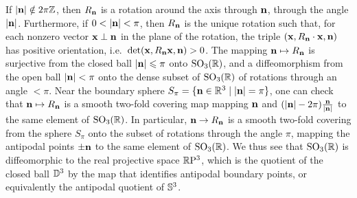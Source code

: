 \begin{example}
    If $|\bf{n}|\notin 2\pi\bbZ$, then $R_{\bf{n}}$ is a rotation around the axis through $\bf{n}$, through the angle $|\bf{n}|$. Furthermore, if $0<|\bf{n}|<\pi$, then $R_{\bf{n}}$ is the unique rotation such that, for each nonzero vector $\bf{x}\perp \bf{n}$ in the plane of the rotation, the triple $(\bf{x},R_{\bf{n}}\cdot \bf{x},\bf{n})$ has positive orientation, i.e.~$\det (\bf{x},R_{\bf{n}} \bf{x},\bf{n})>0$. The mapping $\bf{n}\mapsto R_{\bf{n}}$ is surjective from the closed ball $|\bf{n}|\leq \pi$ onto $\SO_3(\bbR)$, and a diffeomorphism from the open ball $|\bf{n}|<\pi$ onto the dense subset of $\SO_3(\bbR)$ of rotations through an angle $<\pi$. Near the boundary sphere $S_\pi=\{\bf{n}\in\bbR^3\mid |\bf{n}|=\pi\}$, one can check that $\bf{n}\mapsto R_{\bf{n}}$ is a smooth two-fold covering map mapping $\bf{n}$ and $(|\bf{n}|-2\pi)\frac{\bf{n}}{|\bf{n}|}$ to the same element of $\SO_3(\bbR)$. In particular, $\bf{n}\to R_{\bf{n}}$ is a smooth two-fold covering from the sphere $S_\pi$ onto the subset of rotations through the angle $\pi$, mapping the antipodal points $\pm \bf{n}$ to the same element of $\SO_3(\bbR)$. We thus see that $\SO_3(\bbR)$ is diffeomorphic to the real projective space $\RP^3$, which is the quotient of the closed ball $\bbD^3$ by the map that identifies antipodal boundary points, or equivalently the antipodal quotient of $\bbS^3$.
    

\end{example}
